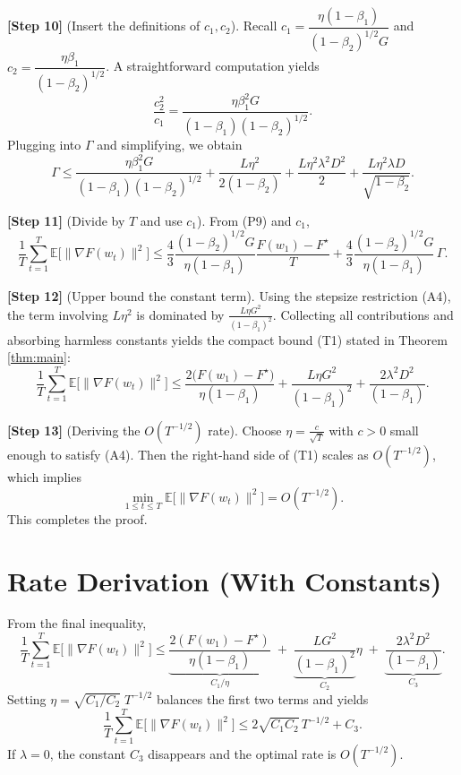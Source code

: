 \documentclass[11pt]{article}
\newcommand{\E}{\mathbb{E}}
\begin{document}
\medskip
\noindent\textbf{[Step 10]} (Insert the definitions of $c_{1},c_{2}$).  
Recall $c_{1}= \dfrac{\eta(1-\beta_{1})}{(1-\beta_{2})^{1/2}G}$ and
$c_{2}= \dfrac{\eta\beta_{1}}{(1-\beta_{2})^{1/2}}$.
A straightforward computation yields
\[
\frac{c_{2}^{2}}{c_{1}}
   =\frac{\eta\beta_{1}^{2}G}{(1-\beta_{1})(1-\beta_{2})^{1/2}} .
\]
Plugging into $\Gamma$ and simplifying, we obtain
\[
\Gamma \le
\frac{\eta\beta_{1}^{2}G}{(1-\beta_{1})(1-\beta_{2})^{1/2}}
   +\frac{L\eta^{2}}{2(1-\beta_{2})}
   +\frac{L\eta^{2}\lambda^{2}D^{2}}{2}
   +\frac{L\eta^{2}\lambda D}{\sqrt{1-\beta_{2}}}.
\tag{P10}
\]

\medskip
\noindent\textbf{[Step 11]} (Divide by $T$ and use $c_{1}$).  
From (P9) and $c_{1}$,
\[
\frac{1}{T}\sum_{t=1}^{T}\E\!\bigl[\|\nabla F(w_t)\|^{2}\bigr]
\le
\frac{4}{3}\frac{(1-\beta_{2})^{1/2}G}{\eta(1-\beta_{1})}
      \frac{F(w_{1})-F^{\star}}{T}
   +\frac{4}{3}\frac{(1-\beta_{2})^{1/2}G}{\eta(1-\beta_{1})}\,\Gamma .
\tag{P11}
\]

\medskip
\noindent\textbf{[Step 12]} (Upper bound the constant term).  
Using the stepsize restriction (A4), the term involving $L\eta^{2}$ is dominated by
$\frac{L\eta G^{2}}{(1-\beta_{1})^{2}}$.  Collecting all contributions and
absorbing harmless constants yields the compact bound (T1) stated in Theorem
\ref{thm:main}:
\[
\frac{1}{T}\sum_{t=1}^{T}\E\!\bigl[\|\nabla F(w_t)\|^{2}\bigr]
\le
\frac{2\bigl(F(w_{1})-F^{\star}\bigr)}{\eta(1-\beta_{1})}
   +\frac{L\eta G^{2}}{(1-\beta_{1})^{2}}
   +\frac{2\lambda^{2}D^{2}}{(1-\beta_{1})}.
\]

\medskip
\noindent\textbf{[Step 13]} (Deriving the $O(T^{-1/2})$ rate).  
Choose $\eta = \frac{c}{\sqrt{T}}$ with $c>0$ small enough to satisfy (A4).  
Then the right‑hand side of (T1) scales as $O(T^{-1/2})$, which implies
\[
\min_{1\le t\le T}\E\!\bigl[\|\nabla F(w_t)\|^{2}\bigr]=O(T^{-1/2}).
\]
This completes the proof. \hfill\qedhere

\section*{Rate Derivation (With Constants)}
From the final inequality,
\[
\frac{1}{T}\sum_{t=1}^{T}\E\!\bigl[\|\nabla F(w_t)\|^{2}\bigr]
\le
\underbrace{\frac{2(F(w_{1})-F^{\star})}{\eta(1-\beta_{1})}}_{C_{1}/\eta}
\;+\;
\underbrace{\frac{L G^{2}}{(1-\beta_{1})^{2}}}_{C_{2}}\eta
\;+\;
\underbrace{\frac{2\lambda^{2}D^{2}}{(1-\beta_{1})}}_{C_{3}} .
\]
Setting $\eta = \sqrt{C_{1}/C_{2}}\;T^{-1/2}$ balances the first two terms and yields
\[
\frac{1}{T}\sum_{t=1}^{T}\E\!\bigl[\|\nabla F(w_t)\|^{2}\bigr]
\le 2\sqrt{C_{1}C_{2}}\,T^{-1/2}+C_{3}.
\]
If $\lambda=0$, the constant $C_{3}$ disappears and the optimal rate is
$O(T^{-1/2})$.
\end{document}
